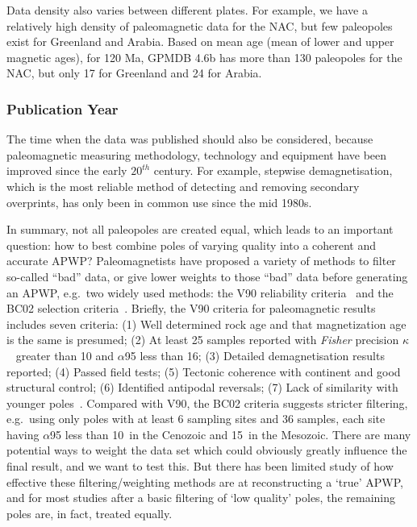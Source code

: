 Data density also varies between different plates. For example, we have a
relatively high density of paleomagnetic data for the NAC, but few paleopoles
exist for Greenland and Arabia. Based on mean age (mean of lower and upper
magnetic ages), for 120 Ma, GPMDB 4.6b has more than 130 paleopoles
for the NAC, but only 17 for Greenland and 24 for Arabia.

\subsubsection{Publication Year}\label{sec:puby}

The time when the data was published should also be considered, because
paleomagnetic measuring methodology, technology and equipment have been improved
since the early $20^{th}$ century. For example, stepwise demagnetisation, which
is the most reliable method of detecting and removing secondary overprints, has
only been in common use since the mid 1980s.

In summary, not all paleopoles are created equal, which leads to an important
question: how to best combine poles of varying quality into a coherent and
accurate APWP\@? Paleomagnetists have proposed a variety of methods to filter
so-called ``bad'' data, or give lower weights to those ``bad'' data before
generating an APWP, e.g.\ two widely used methods: the V90 reliability
criteria~\citep{v90} and the BC02 selection criteria~\citep{B02}. Briefly, the
V90 criteria for paleomagnetic results includes seven criteria: (1) Well
determined rock age and that magnetization age is the same is presumed; (2) At
least 25 samples reported with \emph{Fisher} precision $\kappa$~\citep{F53} greater
than 10 and $\alpha$95 less than 16\degree; (3) Detailed demagnetisation results
reported; (4) Passed field tests; (5) Tectonic coherence with continent and good
structural control; (6) Identified antipodal reversals; (7) Lack of similarity
with younger poles~\citep{T92}. Compared with V90, the BC02 criteria suggests
stricter filtering, e.g.\ using only poles with at least 6 sampling sites and 36
samples, each site having $\alpha$95 less than 10\degree\ in the Cenozoic and
15\degree\ in the Mesozoic. There are many potential ways to weight the data set
which could obviously greatly influence the final result, and we want to test
this. But there has been limited study of how effective these
filtering/weighting methods are at reconstructing a `true' APWP, and for most
studies after a basic filtering of `low quality' poles, the remaining poles are,
in fact, treated equally.

